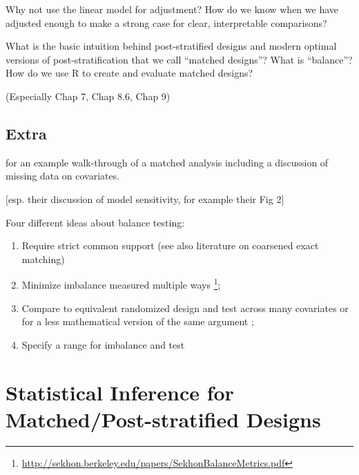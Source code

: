 \documentclass[10pt,letterpaper]{article}
\begin{document}
Why not use the linear model for adjustment? How do we know when we have
adjusted enough to make a strong case for clear, interpretable comparisons?



What is the basic intuition behind post-stratified designs and modern optimal
versions of post-stratification that we call ``matched designs''? What is
``balance''? How do we use R to create and evaluate matched designs?

 (Especially Chap 7, Chap 8.6,
Chap 9)

\subsection{Extra}



 for an example walk-through of a matched analysis
including a discussion of missing data on covariates.

 [esp. their discussion of model sensitivity, for
example their Fig 2]

Four different ideas about balance testing:

\begin{enumerate}
  \item Require strict common support \cite{imai2008mae} (see also literature on coarsened exact matching)
  \item Minimize imbalance measured multiple ways \cite{sekhon2007alternative}\footnote{
  \url{http://sekhon.berkeley.edu/papers/SekhonBalanceMetrics.pdf}};
\item Compare to equivalent randomized design and test across many covariates \cite{hansen2008cbs} \cite{hansen:statmed:2008} or for a less mathematical
version of the same argument \cite[\S 3]{bowers2011mem}; 
\item Specify a range for imbalance and test \cite{hartman2018equivalence}
\end{enumerate}



\AdvanceDate[1]
\section{Statistical Inference for Matched/Post-stratified Designs}
\end{document}
